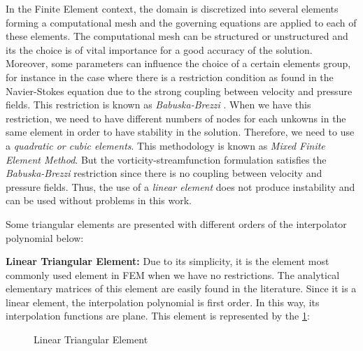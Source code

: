 In the Finite Element context, the domain is discretized into
several elements forming a computational mesh 
and the governing equations are applied to each of these elements.
The computational mesh can be structured or unstructured and 
its the choice is of
vital importance for a good accuracy of the solution. 
Moreover, some parameters can influence the choice of 
a certain elements group, 
for instance in the case where there is a restriction condition 
as found in the Navier-Stokes equation due to the strong coupling 
between velocity and pressure fields. 
This restriction is known as \textit{Babuska-Brezzi} 
\cite{babuska1971} \cite{brezzi1974}. 
When we have this restriction, 
we need to have different numbers of nodes for each unkowns 
in the same element in order to have stability in the solution.
Therefore, we need to use a \textit{quadratic or cubic elements}. 
This methodology is known as \textit{Mixed Finite Element Method}. 
But the vorticity-streamfunction formulation satisfies 
the \textit{Babuska-Brezzi} restriction since there is no coupling 
between velocity and pressure fields. 
Thus, the use of a \textit{linear element} does not produce 
instability and can be used without problems in this work.

\medskip
Some triangular elements are presented with different orders of the interpolator polynomial below:

\medskip
\noindent
\textbf{Linear Triangular Element:} 
Due to its simplicity, 
it is the element most commonly used element in FEM when 
we have no restrictions. The analytical elementary matrices 
of this element are easily found in the literature. 
Since it is a linear element, the interpolation
polynomial is first order. 
In this way, its interpolation functions are plane. 
This element is represented by the \ref{elemento triangular linear}:


\begin{figure}[H]
\caption{Linear Triangular Element}
\begin{center}
\vspace{-0.5cm}
\end{center}
\vspace{-0.5cm}
\label{elemento triangular linear}
\end{figure}

